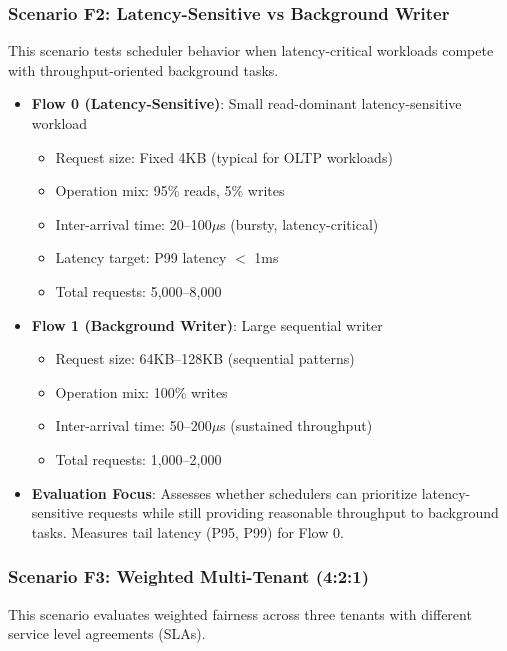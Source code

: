 \documentclass[11pt]{article}
\begin{document}
\subsubsection{Scenario F2: Latency-Sensitive vs Background Writer}

This scenario tests scheduler behavior when latency-critical workloads compete with throughput-oriented background tasks.

\begin{itemize}
    \item \textbf{Flow 0 (Latency-Sensitive)}: Small read-dominant latency-sensitive workload
    \begin{itemize}
        \item Request size: Fixed 4KB (typical for OLTP workloads)
        \item Operation mix: 95\% reads, 5\% writes
        \item Inter-arrival time: 20--100$\mu$s (bursty, latency-critical)
        \item Latency target: P99 latency $<$ 1ms
        \item Total requests: 5,000--8,000
    \end{itemize}
    \item \textbf{Flow 1 (Background Writer)}: Large sequential writer
    \begin{itemize}
        \item Request size: 64KB--128KB (sequential patterns)
        \item Operation mix: 100\% writes
        \item Inter-arrival time: 50--200$\mu$s (sustained throughput)
        \item Total requests: 1,000--2,000
    \end{itemize}
    \item \textbf{Evaluation Focus}: Assesses whether schedulers can prioritize latency-sensitive requests while still providing reasonable throughput to background tasks. Measures tail latency (P95, P99) for Flow 0.
\end{itemize}

\subsubsection{Scenario F3: Weighted Multi-Tenant (4:2:1)}

This scenario evaluates weighted fairness across three tenants with different service level agreements (SLAs).
\end{document}
